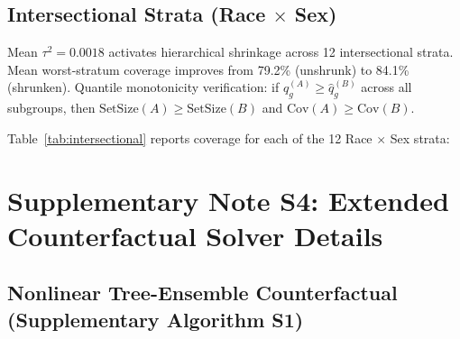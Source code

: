 \documentclass[11pt,a4paper]{article}
\theoremstyle{plain}
\begin{document}
\subsection{Intersectional Strata (Race $\times$ Sex)}

Mean $\tau^2 = 0.0018$ activates hierarchical shrinkage across 12 intersectional strata. Mean worst-stratum coverage improves from 79.2\% (unshrunk) to 84.1\% (shrunken). Quantile monotonicity verification: if $\hat q_g^{(A)} \ge \hat q_g^{(B)}$ across all subgroups, then $\text{SetSize}(A) \ge \text{SetSize}(B)$ and $\text{Cov}(A) \ge \text{Cov}(B)$.

Table~\ref{tab:intersectional} reports coverage for each of the 12 Race $\times$ Sex strata:

\begin{table}[htbp]
\centering
\caption{Intersectional Race $\times$ Sex coverage (12 strata, mean across 20 seeds).}
\label{tab:intersectional}
\end{table}

\section{Supplementary Note S4: Extended Counterfactual Solver Details}
\label{sec:cf_ext}

\subsection{Nonlinear Tree-Ensemble Counterfactual (Supplementary Algorithm S1)}
\end{document}
